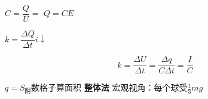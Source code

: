 $C=\dfrac{Q}{U}=$ \qquad $Q=CE$

$k=\dfrac{\Delta Q}{\Delta t}$\qquad $i\downarrow$


\[
k=\frac{\Delta U}{\Delta t}=\frac{\Delta q}{C\Delta t}=\frac{I}{C}
\]


$q=S_{\text{阴}}$\qquad 数格子算面积 %
\textbf{整体法}
宏观视角：每个球受$\frac13mg$

